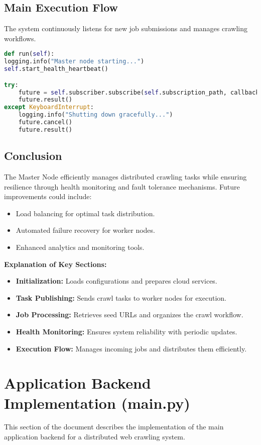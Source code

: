 \documentclass[12pt,a4paper]{report}
\begin{document}
\subsection{Main Execution Flow}
The system continuously listens for new job submissions and manages crawling workflows.
\begin{lstlisting}[language=Python]
def run(self):
logging.info("Master node starting...")
self.start_health_heartbeat()

try:
    future = self.subscriber.subscribe(self.subscription_path, callback=self.handle_new_job)
    future.result()
except KeyboardInterrupt:
    logging.info("Shutting down gracefully...")
    future.cancel()
    future.result()
\end{lstlisting}

\subsection{Conclusion}
The Master Node efficiently manages distributed crawling tasks while ensuring resilience through health monitoring and fault tolerance mechanisms. Future improvements could include:
\begin{itemize}
\item Load balancing for optimal task distribution.
\item Automated failure recovery for worker nodes.
\item Enhanced analytics and monitoring tools.
\end{itemize}
\textbf{Explanation of Key Sections:}
\begin{itemize}
\item \textbf{Initialization:} Loads configurations and prepares cloud services.
\item \textbf{Task Publishing:} Sends crawl tasks to worker nodes for execution.
\item \textbf{Job Processing:} Retrieves seed URLs and organizes the crawl workflow.
\item \textbf {Health Monitoring:} Ensures system reliability with periodic updates.
\item \textbf{Execution Flow:} Manages incoming jobs and distributes them efficiently.
\end{itemize}
\section{Application Backend Implementation \textbf{(main.py})}
This section of the document describes the implementation of the main application backend for a distributed web crawling system. 
\end{document}
